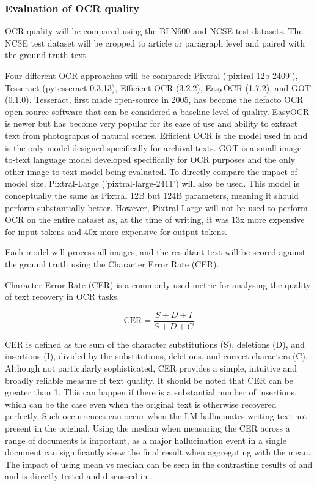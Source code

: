 \documentclass{article} %
\begin{document}
\subsubsection{Evaluation of OCR quality}
OCR quality will be compared using the BLN600 and NCSE test datasets. The NCSE test dataset will be cropped to article or paragraph level and paired with the ground truth text.

Four different OCR approaches will be compared: Pixtral (`pixtral-12b-2409'), Tesseract \cite{smith_overview_2007} (pytesseract 0.3.13), Efficient OCR \cite{carlson_efficient_2024}(3.2.2), EasyOCR (1.7.2), and GOT (0.1.0). Tesseract, first made open-source in 2005, has become the defacto OCR open-source software that can be considered a baseline level of quality. EasyOCR is newer but has become very popular for its ease of use and ability to extract text from photographs of natural scenes. Efficient OCR is the model used in \cite{dell_american_2024} and is the only model designed specifically for archival texts. GOT is a small image-to-text language model developed specifically for OCR purposes and the only other image-to-text model being evaluated. To directly compare the impact of model size, Pixtral-Large ('pixtral-large-2411') will also be used. This model is conceptually the same as Pixtral 12B but 124B parameters, meaning it should perform substantially better. However, Pixtral-Large will not be used to perform OCR on the entire dataset as, at the time of writing, it was 13x more expensive for input tokens and 40x more expensive for output tokens.

Each model will process all images, and the resultant text will be scored against the ground truth using the Character Error Rate (CER).

Character Error Rate (CER) is a commonly used metric for analysing the quality of text recovery in OCR tasks. 

\begin{equation}
    \textrm{CER} = \frac{S + D + I}{S + D + C}
\end{equation}

CER is defined as the sum of the character substitutions (S), deletions (D), and insertions (I), divided by the substitutions, deletions, and correct characters (C). Although not particularly sophisticated, CER provides a simple, intuitive and broadly reliable measure of text quality. It should be noted that CER can be greater than 1. This can happen if there is a substantial number of insertions, which can be the case even when the original text is otherwise recovered perfectly. Such occurrences can occur when the LM hallucinates writing text not present in the original. Using the median when measuring the CER across a range of documents is important, as a major hallucination event in a single document can significantly skew the final result when aggregating with the mean. The impact of using mean vs median can be seen in the contrasting results of \cite{boros_post-correction_2024} and \cite{bourne_clocr-c_2024} and is directly tested and discussed in \cite{bourne_clocr-c_2024}.
\end{document}
